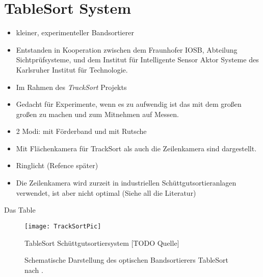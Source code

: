 \section{TableSort System}


\begin{itemize}
	\item kleiner, experimenteller Bandsortierer \cite{doll2015}
	\item Entstanden in Kooperation zwischen dem Fraunhofer IOSB, Abteilung Sichtprüfsysteme, und dem Institut für Intelligente Sensor Aktor Systeme des Karlsruher Institut für Technologie.
	\item Im Rahmen des \textit{TrackSort} Projekts
	\item Gedacht für Experimente, wenn es zu aufwendig ist das mit dem großen großen zu machen und zum Mitnehmen auf Messen.
	\item 2 Modi: mit Förderband und mit Rutsche
	\item Mit Flächenkamera für TrackSort als auch die Zeilenkamera sind dargestellt.
	\item Ringlicht (Refence später)
	\item Die Zeilenkamera wird zurzeit in industriellen Schüttgutsortieranlagen verwendet, ist aber nicht optimal (Siehe all die Literatur)
\end{itemize}

Das Table

\begin{figure}
	\texttt{[image: TrackSortPic]}
	\caption{TableSort Schüttgutsortiersystem [TODO Quelle]}
	\label{fig:tablesortsystem}
\end{figure}


\begin{figure}
    \centering
    \def\svgwidth{\columnwidth}
	
	\label{fig:aufbau_tablesort}
	\caption{Schematische Darstellung des optischen Bandsortierers TableSort nach \cite{Pfaff2017}.}
\end{figure}


